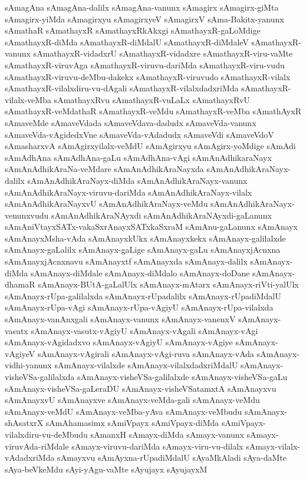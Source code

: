{sAmagAna
sAmagAna-dalilx
sAmagAna-vanunx
sAmagirx
sAmagirx-giMta
sAmagirx-yiMda
sAmagirxyu
sAmagirxyeV
sAmagirxV
sAma-Bakitx-yanunx
sAmathaR
sAmathayxR
sAmathayxRkAkxgi
sAmathayxR-gaLoMdige
sAmathayxR-diMda
sAmathayxR-diMdalU
sAmathayxR-diMdaleV
sAmathayxR-vanunx
sAmathayxR-vidadxrU
sAmathayxR-vidadxre
sAmathayxR-viru-vaMte
sAmathayxR-viruvAga
sAmathayxR-viruvu-dariMda
sAmathayxR-viru-vudu
sAmathayxR-viruvu-deMbu-dakekx
sAmathayxR-viruvudo
sAmathayxR-vilalx
sAmathayxR-vilalxdiru-vu-dAgali
sAmathayxR-vilalxdadxriMda
sAmathayxR-vilalx-veMba
sAmathayxRvu
sAmathayxR-vuLaLx
sAmathayxRvU
sAmathayxR-veMdathaR
sAmathayxR-veMdu
sAmathayxR-veMba
sAmathAyxR
sAmaveMde
sAmaveVdada
sAmaveVdava-dadudx
sAmaveVda-vanunx
sAmaveVda-vAgidedxVne
sAmaveVda-vAdadudx
sAmaveVdi
sAmaveVdoV
sAmasharxvA
sAmAgirxyilalx-veMdU
sAmAgirxyu
sAmAgirx-yoMdige
sAmAdi
sAmAdhAna
sAmAdhAna-gaLu
sAmAdhAna-vAgi
sAmAnAdhikaraNayx
sAmAnAdhikAraNa-veMdare
sAmAnAdhikAraNayxda
sAmAnAdhikAraNayx-dalilx
sAmAnAdhikAraNayx-diMda
sAmAnAdhikAraNayx-vanunx
sAmAnAdhikAraNayx-viruvu-dariMda
sAmAnAdhikAraNayx-vilalx
sAmAnAdhikAraNayxvU
sAmAnAdhikAraNayx-veMdu
sAmAnAdhikAraNayx-venunxvudu
sAmAnAdhikAraNAyxdi
sAmAnAdhikAraNAyxdi-gaLanunx
sAmAniVtayxSATx-vakaSxrAnayxSATxkaSxraM
sAmAnu-gaLanunx
sAmAnayx
sAmAnayxMsha-vAda
sAmAnayxkUkx
sAmAnayxkekx
sAmAnayx-galilalxde
sAmAnayx-gaLalilx
sAmAnayx-gaLige
sAmAnayx-gaLu
sAmAnayxjAcnxna
sAmAnayxjAcnxnavu
sAmAnayxtf
sAmAnayxda
sAmAnayx-dalilx
sAmAnayx-diMda
sAmAnayx-diMdale
sAmAnayx-diMdalo
sAmAnayx-doDane
sAmAnayx-dhamaR
sAmAnayx-BUtA-gaLalUlx
sAmAnayx-mAtarx
sAmAnayx-riVti-yalUlx
sAmAnayx-rUpa-galilalxda
sAmAnayx-rUpadalilx
sAmAnayx-rUpadiMdalU
sAmAnayx-rUpa-vAgi
sAmAnayx-rUpa-vAgiyU
sAmAnayx-rUpa-vilalxda
sAmAnayx-vanAnxgali
sAmAnayx-vanunx
sAmAnayx-vanenxV
sAmAnayx-vasutx
sAmAnayx-vasutx-vAgiyU
sAmAnayx-vAgali
sAmAnayx-vAgi
sAmAnayx-vAgidadxvo
sAmAnayx-vAgiyU
sAmAnayx-vAgiye
sAmAnayx-vAgiyeV
sAmAnayx-vAgirali
sAmAnayx-vAgi-ruva
sAmAnayx-vAda
sAmAnayx-vidhi-yanunx
sAmAnayx-vilalxde
sAmAnayx-vilalxdadxriMdalU
sAmAnayx-visheVSa-galilalxda
sAmAnayx-visheVSa-galilalxde
sAmAnayx-visheVSa-gaLu
sAmAnayx-visheVSa-gaLeraDU
sAmAnayx-visheVSatamxtA
sAmAnayxvu
sAmAnayxvU
sAmAnayxve
sAmAnayx-veMda-gali
sAmAnayx-veMdu
sAmAnayx-veMdU
sAmAnayx-veMba-yAva
sAmAnayx-veMbudu
sAmAnayx-shAsatxrX
sAmAhamasimx
sAmiVpayx
sAmiVpayx-diMda
sAmiVpayx-vilalxdiru-vu-deMbudu
sAmanxH
sAmayx-diMda
sAmayx-vanunx
sAmayx-viruvAda-riMdale
sAmayx-viruvu-dariMda
sAmayx-viru-vu-dilalx
sAmayx-vilalx-vAdadxriMda
sAmayxvu
sAmAyxna-rUpadiMdalU
sAyaMkAladi
sAya-daMte
sAya-beVkeMdu
sAyi-yAgu-vaMte
sAyujayx
sAyujayxM
}
